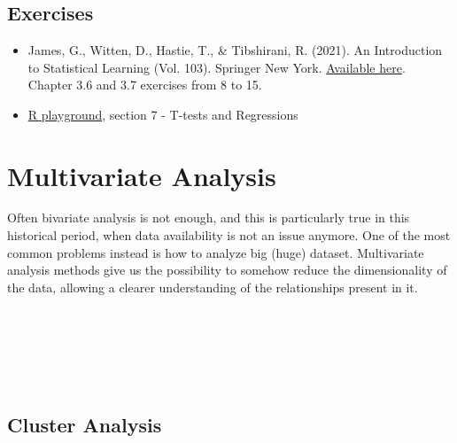 \documentclass[
]{svmono}
\begin{document}
~

~

~

\hypertarget{exercises-4}{%
\section{Exercises}\label{exercises-4}}

\begin{itemize}
\item
  James, G., Witten, D., Hastie, T., \& Tibshirani, R. (2021). An
  Introduction to Statistical Learning (Vol. 103). Springer New York.
  \href{https://www.statlearning.com}{Available here}. Chapter 3.6 and 3.7
  exercises from 8 to 15.
\item
  \href{https://federicoroscioli.shinyapps.io/exercises/}{R playground},
  section 7 - T-tests and Regressions
\end{itemize}

\newpage

\hypertarget{multivariate-analysis}{%
\chapter{Multivariate Analysis}\label{multivariate-analysis}}

Often bivariate analysis is not enough, and this is particularly true in
this historical period, when data availability is not an issue anymore.
One of the most common problems instead is how to analyze big (huge)
dataset. Multivariate analysis methods give us the possibility to
somehow reduce the dimensionality of the data, allowing a clearer
understanding of the relationships present in it.

~

~

~

\hypertarget{cluster-analysis}{%
\section{Cluster Analysis}\label{cluster-analysis}}
\end{document}
